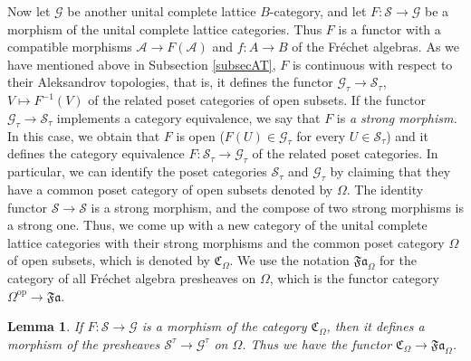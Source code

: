 \documentclass[12pt]{amsart}%
\theoremstyle{plain}
\newtheorem{lemma}{Lemma}
\numberwithin{equation}{section}
\numberwithin{equation}{section}
\numberwithin{theorem}{section}
\numberwithin{lemma}{section}
\numberwithin{remark}{section}
\numberwithin{example}{section}
\numberwithin{proposition}{section}
\numberwithin{definition}{section}
\numberwithin{corollary}{section}
\begin{document}
Now let $\mathcal{G}$ be another unital complete lattice $B$-category, and let
$F:\mathcal{S\rightarrow G}$ be a morphism of the unital complete lattice
categories. Thus $F$ is a functor with a compatible morphisms $\mathcal{A}%
\rightarrow F\left(  \mathcal{A}\right)  $ and $f:A\rightarrow B$ of the
Fr\'{e}chet algebras. As we have mentioned above in Subsection \ref{subsecAT},
$F$ is continuous with respect to their Aleksandrov topologies, that is, it
defines the functor $\mathcal{G}_{\tau}\rightarrow\mathcal{S}_{\tau}$,
$V\mapsto F^{-1}\left(  V\right)  $ of the related poset categories of open
subsets. If the functor $\mathcal{G}_{\tau}\rightarrow\mathcal{S}_{\tau}$
implements a category equivalence, we say that $F$ is \textit{a strong
morphism. }In this case, we obtain that $F$ is open ($F\left(  U\right)
\in\mathcal{G}_{\tau}$ for every $U\in\mathcal{S}_{\tau}$) and it defines the
category equivalence $F:\mathcal{S}_{\tau}\rightarrow\mathcal{G}_{\tau}$ of
the related poset categories. In particular, we can identify the poset
categories $\mathcal{S}_{\tau}$ and $\mathcal{G}_{\tau}$ by claiming that they
have a common poset category of open subsets denoted by $\Omega$. The identity
functor $\mathcal{S\rightarrow S}$ is a strong morphism, and the compose of
two strong morphisms is a strong one. Thus, we come up with a new category of
the unital complete lattice categories with their strong morphisms and the
common poset category $\Omega$ of open subsets, which is denoted by
$\mathfrak{C}_{\Omega}$. We use the notation $\mathfrak{Fa}_{\Omega}$ for the
category of all Fr\'{e}chet algebra presheaves on $\Omega$, which is the
functor category $\Omega^{\operatorname{op}}\rightarrow\mathfrak{Fa}$.

\begin{lemma}
\label{lemCes2}If $F:\mathcal{S}\rightarrow\mathcal{G}$ is a morphism of the
category $\mathfrak{C}_{\Omega}$, then it defines a morphism of the presheaves
$\mathcal{S}^{\tau}\rightarrow\mathcal{G}^{\tau}$ on $\Omega$. Thus we have
the functor $\mathfrak{C}_{\Omega}\rightarrow\mathfrak{Fa}_{\Omega}$.
\end{lemma}
\end{document}
